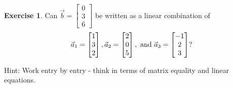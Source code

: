\documentclass[handout]{beamer}
\newcommand{\veca}{\vec{a}}
\newcommand{\vecb}{\vec{b}}
\newcommand{\fn}{\insertframenumber}
\theoremstyle{definition}
\newtheorem{exercise}{Exercise}
\begin{document}
\begin{frame}{\fn}
	\begin{exercise}
		Can $\vecb=\begin{bmatrix}0\\3\\6\end{bmatrix}$ be written as a linear combination of \[\veca_1=\begin{bmatrix}1\\3\\2\end{bmatrix}, \veca_2=\begin{bmatrix}2\\0\\5\end{bmatrix},\textup{ and } \veca_3=\begin{bmatrix}-1\\2\\3\end{bmatrix}?\]
		
		Hint: Work entry by entry - think in terms of matrix equality and linear equations.
	\end{exercise}
\end{frame}
\end{document}
